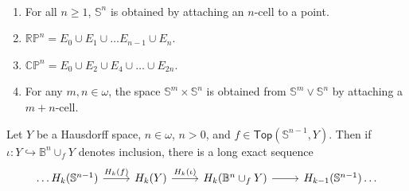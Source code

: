 \begin{examples}
	~
	\begin{enumerate}[label = \textup{(}\alph*\textup{)},wide = 0pt]
		\item For all $n \geq 1$, $\mathbb{S}^n$ is obtained by attaching an $n$-cell to a point.
		\item $\mathbb{RP}^n = E_0 \cup E_1 \cup \dots E_{n - 1} \cup E_n$.
		\item $\mathbb{CP}^n = E_0 \cup E_2 \cup E_4 \cup \dots \cup E_{2n}$.
		\item For any $m,n \in \omega$, the space $\mathbb{S}^m \times \mathbb{S}^n$ is obtained from $\mathbb{S}^m \vee \mathbb{S}^n$ by attaching a $m + n$-cell.
	\end{enumerate}
\end{examples}

\begin{proposition}
	Let $Y$ be a Hausdorff space, $n \in \omega$, $n > 0$, and $f \in \mathsf{Top}(\mathbb{S}^{n - 1},Y)$. Then if $\iota : Y \hookrightarrow  \mathbb{B}^n \cup_f Y$ denotes inclusion, there is a long exact sequence
	\begin{equation*}
		\begin{tikzcd}
			\dots H_k(\mathbb{S}^{n - 1}) \arrow[r,"H_k(f)"] & H_k(Y) \arrow[r,"H_k(\iota)"] & H_k(\mathbb{B}^n \cup_f Y) \arrow[r] & H_{k - 1}(\mathbb{S}^{n - 1}) \dots
		\end{tikzcd}
	\end{equation*}
\end{proposition}

